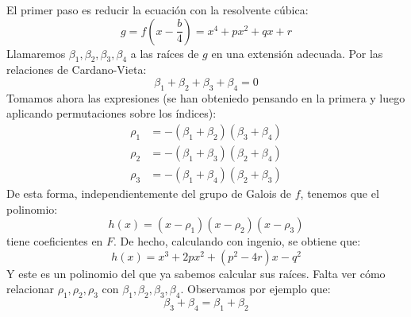 \noindent
El primer paso es reducir la ecuación con la resolvente cúbica:
\begin{equation*}
    g = f\left(x-\frac{b}{4}\right) = x^4+px^2+qx + r 
\end{equation*}
Llamaremos $\beta_1,\beta_2,\beta_3,\beta_4$ a las raíces de $g$ en una extensión adecuada. Por las relaciones de Cardano-Vieta:
\begin{equation*}
    \beta_1 +  \beta_2 + \beta_3 + \beta_4 = 0
\end{equation*}
Tomamos ahora las expresiones (se han obteniedo pensando en la primera y luego aplicando permutaciones sobre los índices):
\begin{align*}
    \rho_1 &= -(\beta_1+\beta_2)(\beta_3+\beta_4) \\
    \rho_2 &= -(\beta_1+\beta_3)(\beta_2+\beta_4) \\
    \rho_3 &= -(\beta_1+\beta_4)(\beta_2+\beta_3)
\end{align*}
De esta forma, independientemente del grupo de Galois de $f$, tenemos que el polinomio:
\begin{equation*}
    h(x) = (x-\rho_1)(x-\rho_2)(x-\rho_3)
\end{equation*}
tiene coeficientes en $F$. De hecho, calculando con ingenio, se obtiene que:
\begin{equation*}
    h(x) = x^3+2px^2 + (p^2-4r)x - q^2
\end{equation*}
Y este es un polinomio del que ya sabemos calcular sus raíces. Falta ver cómo relacionar $\rho_1,\rho_2,\rho_3$ con $\beta_1,\beta_2,\beta_3,\beta_4$. Observamos por ejemplo que:
\begin{equation*}
    \beta_3 + \beta_4 = \beta_1 + \beta_2
\end{equation*}

